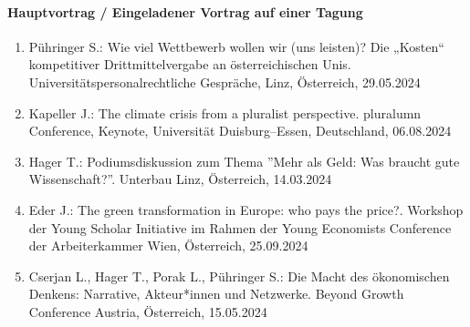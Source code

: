 \paragraph{Hauptvortrag / Eingeladener Vortrag auf einer Tagung}
\begin{enumerate}
	\item Pühringer S.: Wie viel Wettbewerb wollen wir (uns leisten)? Die „Kosten“ kompetitiver Drittmittelvergabe an österreichischen Unis. Universitätspersonalrechtliche Gespräche, Linz, Österreich, 29.05.2024
	\item Kapeller J.: The climate crisis from a pluralist perspective. pluralumn Conference, Keynote, Universität Duisburg--Essen, Deutschland, 06.08.2024
	\item Hager T.: Podiumsdiskussion zum Thema ''Mehr als Geld: Was braucht gute Wissenschaft?''. Unterbau Linz, Österreich, 14.03.2024
	\item Eder J.: The green transformation in Europe: who pays the price?. Workshop der Young Scholar Initiative im Rahmen der Young Economists Conference der Arbeiterkammer Wien, Österreich, 25.09.2024
	\item Cserjan L., Hager T., Porak L., Pühringer S.: Die Macht des ökonomischen Denkens: Narrative, Akteur*innen und Netzwerke. Beyond Growth Conference Austria, Österreich, 15.05.2024
\end{enumerate}
